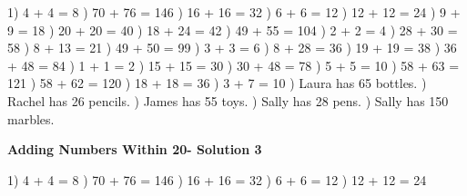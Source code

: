 \documentclass{article}%
\begin{document}
1) 4 + 4 = 8%
) 70 + 76 = 146%
) 16 + 16 = 32%
) 6 + 6 = 12%
) 12 + 12 = 24%
) 9 + 9 = 18%
) 20 + 20 = 40%
) 18 + 24 = 42%
) 49 + 55 = 104%
) 2 + 2 = 4%
) 28 + 30 = 58%
) 8 + 13 = 21%
) 49 + 50 = 99%
) 3 + 3 = 6%
) 8 + 28 = 36%
) 19 + 19 = 38%
) 36 + 48 = 84%
) 1 + 1 = 2%
) 15 + 15 = 30%
) 30 + 48 = 78%
) 5 + 5 = 10%
) 58 + 63 = 121%
) 58 + 62 = 120%
) 18 + 18 = 36%
) 3 + 7 = 10%
) Laura has 65 bottles.%
) Rachel has 26 pencils.%
) James has 55 toys.%
) Sally has 28 pens.%
) Sally has 150 marbles.%
\newline%
\newpage%
\large%
\begin{center}%
\textbf{Adding Numbers Within 20- Solution 3}%
\newline%
\end{center} \normalsize%
1) 4 + 4 = 8%
) 70 + 76 = 146%
) 16 + 16 = 32%
) 6 + 6 = 12%
) 12 + 12 = 24%
\newline%
\end{document}
